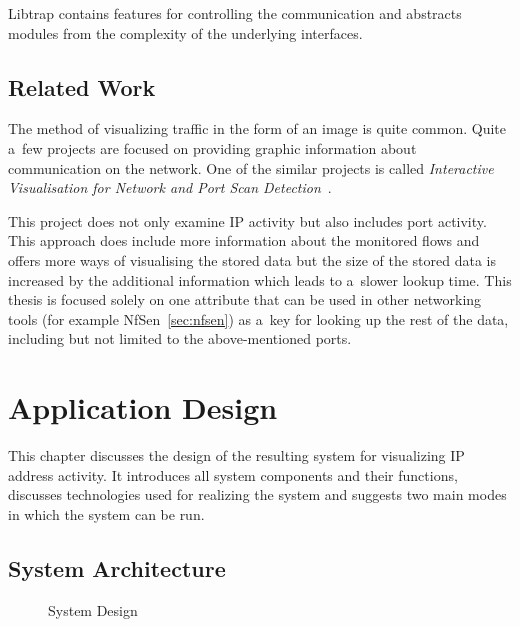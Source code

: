 Libtrap contains features for controlling the communication and abstracts modules
from the complexity of the underlying interfaces.

\section{Related Work}
The method of visualizing traffic in the form of an image is quite common. Quite a~few projects are focused on
providing graphic information about communication on the network. One of the similar projects is
called \textit{Interactive Visualisation for Network and Port Scan Detection}~\cite{related}.

This project does not only examine IP activity but also includes port activity. This approach
does include more information about the monitored flows and offers more ways of visualising
the stored data but the size of the stored data is increased by the additional information
which leads to a~slower lookup time. This thesis is focused solely on one
attribute that can be used in other networking tools (for example NfSen~\ref{sec:nfsen}) as a~key for looking up
the rest of the data, including but not limited to the above-mentioned ports.

\csdoublequotesoff

\chapter{Application Design}\label{sec:chapter3}
This chapter discusses the design of the resulting system for visualizing IP address activity.
It introduces all system components and their functions, discusses technologies used for
realizing the system and suggests two main modes in which the system can be run.

\section{System Architecture}

\begin{figure}[ht]
   \begin{center}
		 \hfill
      \caption{System Design} \label{fig:design}
	\end{center}
\end{figure}

